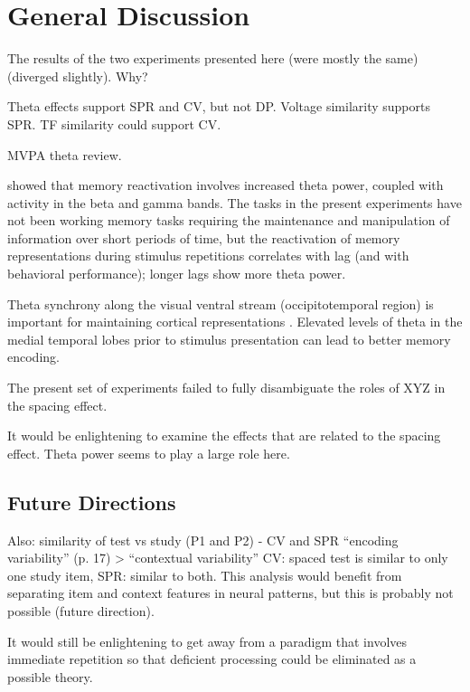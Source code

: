 
\section{General Discussion}

The results of the two experiments presented here (were mostly the same) (diverged slightly).  Why?


Theta effects support SPR and CV, but not DP.  Voltage similarity supports SPR.  TF similarity could support CV.

\cite{JafaEtal2013} MVPA theta review.

 showed that memory reactivation involves increased theta power, coupled with activity in the beta and gamma bands.
The tasks in the present experiments have not been working memory tasks requiring the maintenance and manipulation of information over short periods of time, but the reactivation of memory representations during stimulus repetitions correlates with lag (and with behavioral performance); longer lags show more theta power.

Theta synchrony along the visual ventral stream (occipitotemporal region) is important for maintaining cortical representations \cite{DuzeEtal2010}.  Elevated levels of theta in the medial temporal lobes prior to stimulus presentation can lead to better memory encoding.


The present set of experiments failed to fully disambiguate the roles of XYZ in the spacing effect.


It would be enlightening to examine the effects that are related to the spacing effect.  Theta power seems to play a large role here.


\subsection{Future Directions}


Also: similarity of test vs study (P1 and P2) - CV and SPR
``encoding variability''  (p. 17) > ``contextual variability''
CV: spaced test is similar to only one study item, SPR: similar to both.
This analysis would benefit from separating item and context features in neural patterns, but this is probably not possible (future direction).


It would still be enlightening to get away from a paradigm that involves immediate repetition so that deficient processing could be eliminated as a possible theory. 

